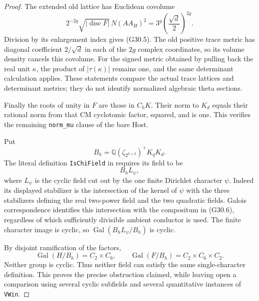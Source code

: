 \begin{proof}
The extended old lattice has Euclidean covolume
\[
 2^{-2g}\sqrt{|\operatorname{disc}F|}\,N(AA_H)^2
       =3^g\left(\frac{\sqrt d}{2}\right)^{2g}.
\]
Division by its enlargement index gives (G30.5).
The old positive trace metric has diagonal coefficient
$2/\sqrt d$ in each of the $2g$ complex coordinates, so
its volume density cancels this covolume.  For the signed
metric obtained by pulling back the real unit $\kappa$,
the product of $|\tau(\kappa)|$ remains one, and the
same determinant calculation applies.  These statements
compare the actual trace lattices and determinant metrics;
they do not identify normalized algebraic theta sections.

Finally the roots of unity in $F$ are those in $C_hK$.
Their norm to $K_d$ equals their rational norm from that
CM cyclotomic factor, squared, and is one.  This verifies
the remaining \texttt{norm\_mu} clause of the bare Host.

Put
\[
 B_h=\mathbb Q(\zeta_{2^{h+2}})^+K_qK_d.
\]
The literal definition \texttt{IsChiField} in
requires its field to be
\[
                           B_hL_\psi,                 \tag{G30.6}
\]
where $L_\psi$ is the cyclic field cut out by the one finite
Dirichlet character $\psi$.  Indeed its displayed stabilizer
is the intersection of the kernel of $\psi$ with the three
stabilizers defining the real two-power field and the two
quadratic fields.  Galois correspondence identifies this
intersection with the compositum in (G30.6), regardless
of which sufficiently divisible ambient conductor is used.
The finite character image is cyclic, so
$\operatorname{Gal}(B_hL_\psi/B_h)$ is cyclic.

By disjoint ramification of the factors,
\[
 \operatorname{Gal}(H/B_h)=C_2\times C_6,
 \qquad
 \operatorname{Gal}(F/B_h)=C_2\times C_6\times C_2.
                                                               \tag{G30.7}
\]
Neither group is cyclic.  Thus neither field can satisfy
the same single-character definition.  This proves the
precise obstruction claimed, while leaving open a comparison
using several cyclic subfields and several quantitative
instances of \texttt{VWin}.
\end{proof}

